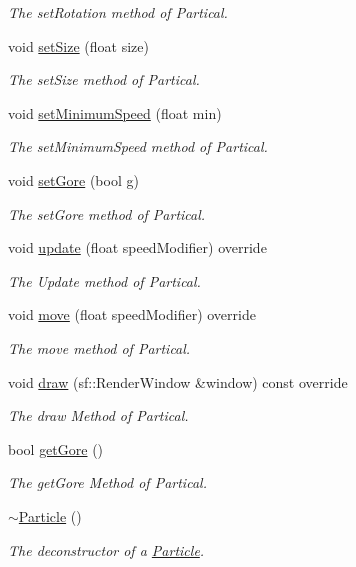 \begin{DoxyCompactItemize}
\begin{DoxyCompactList}\small\item\em The set\+Rotation method of Partical. \end{DoxyCompactList}\item 
void \hyperlink{class_particle_a9cbcb7c7f4b1f1d11033a9eea16bae2c}{set\+Size} (float size)
\begin{DoxyCompactList}\small\item\em The set\+Size method of Partical. \end{DoxyCompactList}\item 
void \hyperlink{class_particle_aed19fba4d00acaa104bf1030c99b99e9}{set\+Minimum\+Speed} (float min)
\begin{DoxyCompactList}\small\item\em The set\+Minimum\+Speed method of Partical. \end{DoxyCompactList}\item 
void \hyperlink{class_particle_a88d3824351cadeda57b752a6bc14d175}{set\+Gore} (bool g)
\begin{DoxyCompactList}\small\item\em The set\+Gore method of Partical. \end{DoxyCompactList}\item 
void \hyperlink{class_particle_a9bd18a091946b1814f685118dfe66a1e}{update} (float speed\+Modifier) override
\begin{DoxyCompactList}\small\item\em The Update method of Partical. \end{DoxyCompactList}\item 
void \hyperlink{class_particle_a6273669457c67cde70b992a59e589022}{move} (float speed\+Modifier) override
\begin{DoxyCompactList}\small\item\em The move method of Partical. \end{DoxyCompactList}\item 
void \hyperlink{class_particle_afa25f9b8898269ebf36593d7176b3145}{draw} (sf\+::\+Render\+Window \&window) const override
\begin{DoxyCompactList}\small\item\em The draw Method of Partical. \end{DoxyCompactList}\item 
bool \hyperlink{class_particle_a22249cbdfd21c42b65db1ce9936202c9}{get\+Gore} ()
\begin{DoxyCompactList}\small\item\em The get\+Gore Method of Partical. \end{DoxyCompactList}\item 
\hypertarget{class_particle_ad030d0fe7b88cf81744b127c99244ff4}{\hyperlink{class_particle_ad030d0fe7b88cf81744b127c99244ff4}{$\sim$\+Particle} ()}\label{class_particle_ad030d0fe7b88cf81744b127c99244ff4}

\begin{DoxyCompactList}\small\item\em The deconstructor of a \hyperlink{class_particle}{Particle}. \end{DoxyCompactList}\end{DoxyCompactItemize}
